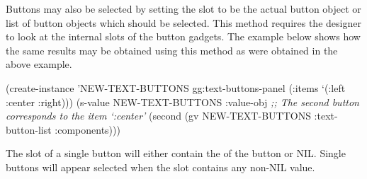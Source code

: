 \begin{group}
Buttons may also be selected by setting the  slot to be the
actual button object or list of button objects which should be selected.
This method requires the designer to look at the internal slots of the button
gadgets.  The example below shows how the same results may be
obtained using this method as were obtained in the above example.

\begin{programexample}
(create-instance 'NEW-TEXT-BUTTONS gg:text-buttons-panel
   (:items `(:left :center :right)))
(s-value NEW-TEXT-BUTTONS
         :value-obj
         {\it ;; The second button corresponds to the item `:center'}
         (second (gv NEW-TEXT-BUTTONS :text-button-list :components)))
\end{programexample}
\end{group}

The  slot of a single button will either contain the 
of the button or NIL.  Single buttons will appear selected when the 
slot contains any non-NIL value.



